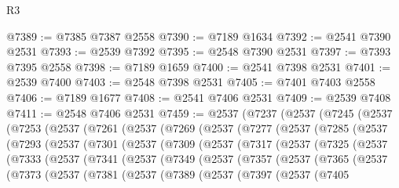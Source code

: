 \begin{lexlean}{R3}
\begin{coremodule}
@7389 := @7385 @7387 @2558
@7390 := @7189 @1634
@7392 := @2541 @7390 @2531
@7393 := @2539 @7392
@7395 := @2548 @7390 @2531
@7397 := @7393 @7395 @2558
@7398 := @7189 @1659
@7400 := @2541 @7398 @2531
@7401 := @2539 @7400
@7403 := @2548 @7398 @2531
@7405 := @7401 @7403 @2558
@7406 := @7189 @1677
@7408 := @2541 @7406 @2531
@7409 := @2539 @7408
@7411 := @2548 @7406 @2531
@7459 := @2537
    (@7237
      (@2537
        (@7245
          (@2537
            (@7253
              (@2537
                (@7261
                  (@2537
                    (@7269
                      (@2537
                        (@7277
                          (@2537
                            (@7285
                              (@2537
                                (@7293
                                  (@2537
                                    (@7301
                                      (@2537
                                        (@7309
                                          (@2537
                                            (@7317
                                              (@2537
                                                (@7325
                                                  (@2537
                                                    (@7333
                                                      (@2537
                                                        (@7341
                                                          (@2537
                                                            (@7349
                                                              (@2537
                                                                (@7357
                                                                  (@2537
                                                                    (@7365
                                                                      (@2537
                                                                        (@7373
                                                                          (@2537
                                                                            (@7381
                                                                              (@2537
                                                                                (@7389
                                                                                  (@2537
                                                                                    (@7397
                                                                                      (@2537
                                                                                        (@7405

\end{coremodule}
\end{lexlean}
